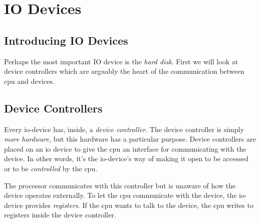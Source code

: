 

\chapter{IO Devices}


\section{Introducing IO Devices}


Perhaps the most important IO device is the \textit{hard disk}. 
First we will look at device controllers which are arguably the heart of the
communication between cpu and devices. 

\section{Device Controllers}

Every io-device has, inside, a \textit{device controller}.  
The device controller is simply \textit{more hardware}, 
but this hardware has a particular purpose. 
Device controllers are placed on an io device to give the cpu an interface for communicating
with the device. In other words, it’s the io-device’s way of making it open to be 
accessed or to be \textit{controlled} by the cpu.

\begin{figure}[h]
\end{figure} 

The processor communicates with this controller but is unaware of how the device 
operates externally. To let the cpu communicate with the device, the io-device provides 
\textit{registers}. If the cpu wants to talk to the device, the cpu writes 
to registers inside the device controller. 

\begin{figure}[h]
\end{figure} 

